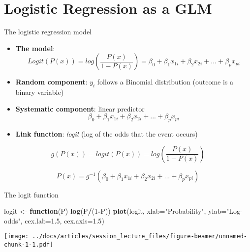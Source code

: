 \documentclass[
  ignorenonframetext,
]{beamer}
\newenvironment{Shaded}{\begin{snugshade}}{\end{snugshade}}
\newcommand{\ControlFlowTok}[1]{\textcolor[rgb]{0.13,0.29,0.53}{\textbf{#1}}}
\newcommand{\DataTypeTok}[1]{\textcolor[rgb]{0.13,0.29,0.53}{#1}}
\newcommand{\DecValTok}[1]{\textcolor[rgb]{0.00,0.00,0.81}{#1}}
\newcommand{\FloatTok}[1]{\textcolor[rgb]{0.00,0.00,0.81}{#1}}
\newcommand{\KeywordTok}[1]{\textcolor[rgb]{0.13,0.29,0.53}{\textbf{#1}}}
\newcommand{\NormalTok}[1]{#1}
\newcommand{\OperatorTok}[1]{\textcolor[rgb]{0.81,0.36,0.00}{\textbf{#1}}}
\newcommand{\StringTok}[1]{\textcolor[rgb]{0.31,0.60,0.02}{#1}}
\providecommand{\tightlist}{%
  \setlength{\itemsep}{0pt}\setlength{\parskip}{0pt}}
\begin{document}
\hypertarget{logistic-regression-as-a-glm}{%
\section{Logistic Regression as a
GLM}\label{logistic-regression-as-a-glm}}

\begin{frame}{The logistic regression model}
\protect\hypertarget{the-logistic-regression-model}{}

\begin{itemize}
\tightlist
\item
  \textbf{The model}: \tiny \[
  Logit(P(x)) = log \left( \frac{P(x)}{1-P(x)} \right) = \beta_0 + \beta_1 x_{1i} + \beta_2 x_{2i} + ... + \beta_p x_{pi}
  \]
\end{itemize}

\normalsize

\begin{itemize}
\item
  \textbf{Random component}: \(y_i\) follows a Binomial distribution
  (outcome is a binary variable)
\item
  \textbf{Systematic component}: linear predictor \[
  \beta_0 + \beta_1 x_{1i} + \beta_2 x_{2i} + ... + \beta_p x_{pi}
  \]
\item
  \textbf{Link function}: \emph{logit} (log of the odds that the event
  occurs)
\end{itemize}

\tiny

\[
g(P(x)) = logit(P(x)) = log\left( \frac{P(x)}{1-P(x)} \right)
\]

\[
P(x) = g^{-1}\left( \beta_0 + \beta_1 x_{1i} + \beta_2 x_{2i} + ... + \beta_p x_{pi}
 \right)
\]

\end{frame}

\begin{frame}[fragile]{The logit function}
\protect\hypertarget{the-logit-function}{}

\small

\begin{Shaded}
\begin{Highlighting}[]
\NormalTok{logit <-}\StringTok{ }\ControlFlowTok{function}\NormalTok{(P) }\KeywordTok{log}\NormalTok{(P}\OperatorTok{/}\NormalTok{(}\DecValTok{1}\OperatorTok{-}\NormalTok{P))}
\KeywordTok{plot}\NormalTok{(logit, }\DataTypeTok{xlab=}\StringTok{"Probability"}\NormalTok{, }\DataTypeTok{ylab=}\StringTok{"Log-odds"}\NormalTok{,}
     \DataTypeTok{cex.lab=}\FloatTok{1.5}\NormalTok{, }\DataTypeTok{cex.axis=}\FloatTok{1.5}\NormalTok{)}
\end{Highlighting}
\end{Shaded}

\texttt{[image: ../docs/articles/session\_lecture\_files/figure-beamer/unnamed-chunk-1-1.pdf]}

\end{frame}
\end{document}
